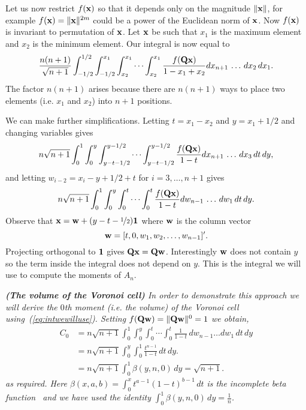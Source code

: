 \documentclass[draftcls, onecolumn, 11pt]{IEEEtran}
\begin{document}
Let us now restrict $f(\mathbf{x})$ so that it depends only on the magnitude $\|\mathbf{x}\|$, for example $f(\mathbf{x}) = \|\mathbf{x}\|^{2m}$ could be a power of the Euclidean norm of $\mathbf{x}$.  Now $f(\mathbf{x})$ is invariant to permutation of $\mathbf{x}$.  Let $\mathbf{x}$ be such that $x_1$ is the maximum element and $x_2$ is the minimum element.  Our integral is now equal to
\[
\frac{n (n+1)}{\sqrt{n+1}} \int^{1/2}_{-1/2} \int^{x_1}_{-1/2}  \int^{x_1}_{x_2} \cdots \int^{x_1}_{x_2} \frac{f(\mathbf{Q}\mathbf{x})}{1 - x_{1} + x_{2}}  dx_{n+1} \, \dots \, dx_2 \, dx_1.
\]
The factor $n(n+1)$ arises because there are $n(n+1)$ ways to place two elements (i.e. $x_1$ and $x_2$) into $n+1$ positions.

We can make further simplifications.  Letting $t = x_1 - x_2$ and $y = x_1 + 1/2$ and changing variables gives
\[
n \sqrt{n+1} \int^{1}_{0} \int^{y}_{0}  \int^{y - 1/2}_{y - t - 1/2} \cdots \int^{y-1/2}_{y-t-1/2} \frac{f(\mathbf{Q}\mathbf{x} )}{1 - t}  dx_{n+1} \, \dots \, dx_3 \, dt \, dy,
\]
and letting $w_{i-2} = x_i - y + 1/2 + t$ for $i = 3,\dots,n+1$ gives
\begin{equation}\label{eq:intwewilluse}
n \sqrt{n+1} \int^{1}_{0} \int^{y}_{0}  \int^{t}_{0} \cdots \int^{t}_{0} \frac{f(\Qbf\xbf )}{1 - t}  dw_{n-1} \, \dots \, dw_1 \, dt \, dy.
\end{equation}
Observe that $\mathbf{x} = \mathbf{w} + (y - t - \nicefrac{1}{2})\boldsymbol{1}$ where $\mathbf{w}$ is the column vector
\[
\mathbf{w} = [t, 0, w_1, w_2, \dots, w_{n-1}]^\prime.
\]
Projecting orthogonal to $\boldsymbol{1}$ gives $\mathbf{Q}\mathbf{x} = \mathbf{Q} \mathbf{w}$.  Interestingly $\mathbf{w}$ does not contain $y$ so the term inside the integral does not depend on $y$.  This is the integral we will use to compute the moments of $A_n$.

\begin{example}\emph{\textbf{(The volume of the Voronoi cell)}
In order to demonstrate this approach we will derive the $0$th moment (i.e. the volume) of the Voronoi cell using~(\ref{eq:intwewilluse}).  Setting $f(\mathbf{Q}\mathbf{w}) = \|\mathbf{Q}\mathbf{w}\|^0 = 1$ we obtain,
\begin{align*}
C_0 &= n\sqrt{n+1} \int^{1}_{0} \int^{y}_{0} \int^{t}_{0} \cdots \int^{t}_{0} \frac{1}{1 - t} \,dw_{n-1}\dots dw_1 \, dt  \, dy\\
 &= n\sqrt{n+1} \int^{y}_{0} \int_{0}^{1}  \frac{t^{n-1}}{1 - t} \, dt  \, dy. \\
&= n\sqrt{n+1}  \int^{1}_{0} \beta(y, n, 0) \, dy = \sqrt{n+1}.
\end{align*}
as required.  Here $\beta(x,a,b) =  \int_{0}^{x}  t^{a-1}(1 - t)^{b-1} \,dt$ is the incomplete beta function~\cite{Pearson_tables_of_beta_functions} and we have used the identity $\int^{1}_{0} \beta(y, n, 0) \, dy = \frac{1}{n}$.}
\end{example}
\end{document}
